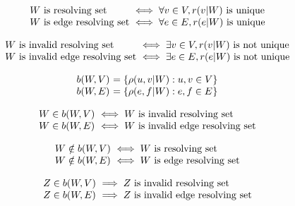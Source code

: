 \begin{definition}
	\[\begin{array}{l@{\ }l}
		W \text{ is resolving set} &\iff \forall v \in V, r(v|W) \text{ is unique} \\
		W \text{ is edge resolving set} &\iff \forall e \in E, r(e|W) \text{ is unique}
	\end{array}\]
\end{definition}

\begin{corollary}
	\[\begin{array}{l@{\ }l}
		W \text{ is invalid resolving set} &\iff \exists v \in V, r(v|W) \text{ is not unique} \\
		W \text{ is invalid edge resolving set} &\iff \exists e \in E, r(e|W) \text{ is not unique}
	\end{array}\]
\end{corollary}

\begin{definition}
	\[\begin{array}{l@{\ }l@{}l@{}l}
		b(W,V) &= \{\rho(u,v&|W) : u, v \in V&\} \\
		b(W,E) &= \{\rho(e,f&|W) : e, f \in E&\}
	\end{array}\]
\end{definition}

\begin{lemma}
	\[\begin{array}{l@{\ }l}
		W \in b(W,V) &\iff W \text{ is invalid resolving set} \\
		W \in b(W,E) &\iff W \text{ is invalid edge resolving set}
	\end{array}\]
\end{lemma}

\begin{corollary}
	\[\begin{array}{l@{\ }l}
		W \notin b(W,V) &\iff W \text{ is resolving set} \\
		W \notin b(W,E) &\iff W \text{ is edge resolving set}
	\end{array}\]
\end{corollary}

\begin{lemma}
	\[\begin{array}{l@{\ }l}
		Z \in b(W,V) &\implies Z \text{ is invalid resolving set} \\
		Z \in b(W,E) &\implies Z \text{ is invalid edge resolving set}
	\end{array}\]
\end{lemma}

